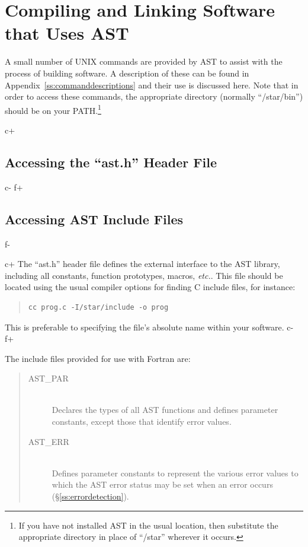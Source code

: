 \documentclass[twoside,11pt]{article}
\newcommand{\appref}[1]{Appendix~\ref{#1}}
\newcommand{\secref}[1]{\S\ref{#1}}
\newcommand{\appref}[1]{\ref{#1}}
\newcommand{\secref}[1]{\ref{#1}}
\begin{document}
\cleardoublepage
\section{Compiling and Linking Software that Uses AST}

A small number of UNIX commands are provided by AST to assist with the
process of building software. A description of these can be found in
\appref{ss:commanddescriptions} and their use is discussed here.  Note
that in order to access these commands, the appropriate directory
(normally ``/star/bin'') should be on your PATH.\footnote{If you have
not installed AST in the usual location, then substitute the
appropriate directory in place of ``/star'' wherever it occurs.}

c+
\subsection{\label{ss:accessingheaderfile}Accessing the ``ast.h'' Header File}
c-
f+
\subsection{\label{ss:accessingheaderfile}Accessing AST Include Files}
f-

c+
The ``ast.h'' header file defines the external interface to the AST library,
including all constants, function prototypes, macros, {\em{etc.}}. This file
should be located using the usual compiler options for finding C
include files, for instance:

\begin{quote}
\small
\begin{verbatim}
cc prog.c -I/star/include -o prog
\end{verbatim}
\normalsize
\end{quote}

This is preferable to specifying the file's absolute name within your
software.
c-
f+

The include files provided for use with Fortran are:

\begin{quote}
\begin{description}
\item[AST\_PAR]\mbox{}\\
Declares the types of all AST functions and defines parameter
constants, except those that identify error values.

\item[AST\_ERR]\mbox{}\\
Defines parameter constants to represent the various error values to
which the AST error status may be set when an error occurs
(\secref{ss:errordetection}).
\end{description}
\end{quote}
\end{document}
